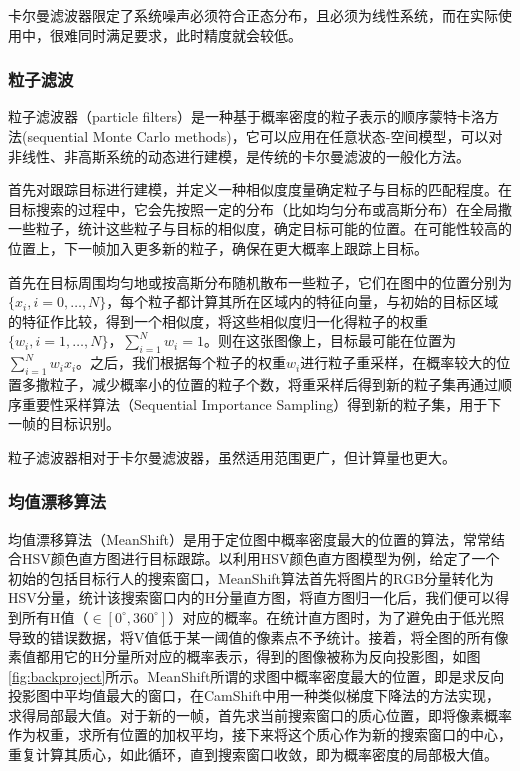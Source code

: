   卡尔曼滤波器限定了系统噪声必须符合正态分布，且必须为线性系统，而在实际使用中，很难同时满足要求，此时精度就会较低。

\subsubsection{粒子滤波}

  粒子滤波器（particle filters）是一种基于概率密度的粒子表示的顺序蒙特卡洛方法(sequential Monte Carlo methods)，它可以应用在任意状态-空间模型，可以对非线性、非高斯系统的动态进行建模，是传统的卡尔曼滤波的一般化方法\cite{arulampalam2002tutorial}。

  首先对跟踪目标进行建模，并定义一种相似度度量确定粒子与目标的匹配程度。在目标搜索的过程中，它会先按照一定的分布（比如均匀分布或高斯分布）在全局撒一些粒子，统计这些粒子与目标的相似度，确定目标可能的位置。在可能性较高的位置上，下一帧加入更多新的粒子，确保在更大概率上跟踪上目标。

  首先在目标周围均匀地或按高斯分布随机散布一些粒子，它们在图中的位置分别为$\{x_i,i=0,\dots,N\}$，每个粒子都计算其所在区域内的特征向量，与初始的目标区域的特征作比较，得到一个相似度，将这些相似度归一化得粒子的权重$\{w_i,i=1,\dots,N\}$，$\sum_{i=1}^N w_i = 1$。则在这张图像上，目标最可能在位置为$\sum_{i=1}^N w_i x_i$。之后，我们根据每个粒子的权重$w_i$进行粒子重采样，在概率较大的位置多撒粒子，减少概率小的位置的粒子个数，将重采样后得到新的粒子集再通过顺序重要性采样算法（Sequential Importance Sampling）得到新的粒子集，用于下一帧的目标识别。

  粒子滤波器相对于卡尔曼滤波器，虽然适用范围更广，但计算量也更大。

\subsubsection{均值漂移算法}
 
  均值漂移算法（MeanShift）是用于定位图中概率密度最大的位置的算法，常常结合HSV颜色直方图进行目标跟踪。以利用HSV颜色直方图模型为例，给定了一个初始的包括目标行人的搜索窗口，MeanShift算法首先将图片的RGB分量转化为HSV分量，统计该搜索窗口内的H分量直方图，将直方图归一化后，我们便可以得到所有H值（$\in [0^{\circ},360^{\circ}]$）对应的概率。在统计直方图时，为了避免由于低光照导致的错误数据，将V值低于某一阈值的像素点不予统计。接着，将全图的所有像素值都用它的H分量所对应的概率表示，得到的图像被称为反向投影图，如图\ref{fig:backproject}所示。MeanShift所谓的求图中概率密度最大的位置，即是求反向投影图中平均值最大的窗口，在CamShift中用一种类似梯度下降法的方法实现，求得局部最大值。对于新的一帧，首先求当前搜索窗口的质心位置，即将像素概率作为权重，求所有位置的加权平均，接下来将这个质心作为新的搜索窗口的中心，重复计算其质心，如此循环，直到搜索窗口收敛，即为概率密度的局部极大值。

